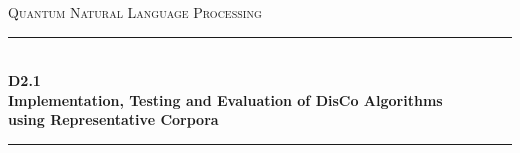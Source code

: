 \documentclass[11pt]{article}
\begin{document}
\begin{titlepage}
\newcommand{\HRule}{\rule{\linewidth}{0.1mm}} 
\center %
 
\vfill
\textsc{\LARGE Quantum Natural Language Processing}
\vfill
\HRule \\[0.4cm]
{ \Large \bfseries D2.1} \\[0.3cm]
{ \Large \bfseries Implementation, Testing and Evaluation of DisCo Algorithms \\[0.1cm]using Representative Corpora}\\[0.1cm]
\HRule \\[1.5cm]
 

\end{titlepage}
\end{document}
